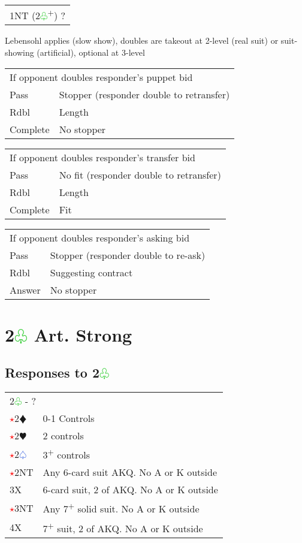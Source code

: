 \documentclass{article}
\renewcommand{\sp}{\textcolor{RoyalBlue}{$\varspade$}}
\newcommand{\he}{\textcolor{RubineRed}{$\varheart$}}
\newcommand{\di}{\textcolor{Peach}{$\vardiamond$}}
\newcommand{\cl}{\textcolor{LimeGreen}{$\varclub$}}
\newcommand{\nt}{\relsize{-1}NT\relsize{1}}
\newcommand{\up}{\textsuperscript{+}}
\newcommand{\al}{\textcolor{red}{$\star$}}
\begin{document}
\medskip

\begin{tabular}{|l|p{6.5cm}}
	\multicolumn{2}{l}{1\nt{} (2\cl{}\up{}) ?}\\
\end{tabular}

Lebensohl applies (slow show), doubles are takeout at 2-level (real suit) or suit-showing (artificial), optional at 3-level \\

\begin{tabular}{|l|p{6.5cm}}
	\multicolumn{2}{l}{If opponent doubles responder's puppet bid}\\
	Pass & Stopper (responder double to retransfer) \\
	Rdbl & Length \\
	Complete & No stopper
\end{tabular}

\medskip

\begin{tabular}{|l|p{6.5cm}}
	\multicolumn{2}{l}{If opponent doubles responder's transfer bid}\\
	Pass & No fit (responder double to retransfer) \\
	Rdbl & Length \\
	Complete & Fit
\end{tabular}

\medskip

\begin{tabular}{|l|p{6.5cm}}
	\multicolumn{2}{l}{If opponent doubles responder's asking bid}\\
	Pass & Stopper (responder double to re-ask) \\
	Rdbl & Suggesting contract \\
	Answer & No stopper
\end{tabular}

\section{2\cl{} Art. Strong}

\subsection{Responses to 2\cl{}}

\begin{tabular}{|l|p{6.5cm}}
	\multicolumn{2}{l}{2\cl{} - ?}\\
	\al{}2\di{} & 0-1 Controls \\
	\al{}2\he{} & 2 controls \\
	\al{}2\sp{} & 3\up{} controls \\
	\al{}2\nt{} & Any 6-card suit AKQ. No A or K outside  \\
	3X & 6-card suit, 2 of AKQ. No A or K outside \\
	\al{}3\nt{} & Any 7\up{} solid suit. No A or K outside \\
	4X & 7\up{} suit, 2 of AKQ. No A or K outside \\
\end{tabular}
\end{document}
